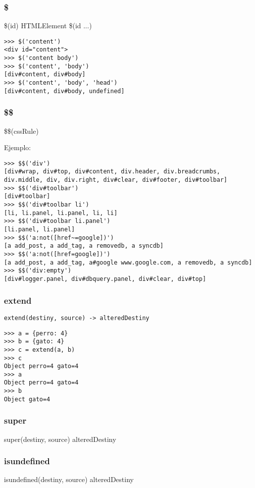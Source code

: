 \subsubsection*{\$}
\$(id) \rightarrow HTMLElement
\$(id ...) \rightarrow [HTMLElement...]

\begin{lstlisting}[style=consola]
>>> $('content')
<div id="content">
>>> $('content body')
>>> $('content', 'body')
[div#content, div#body]
>>> $('content', 'body', 'head')
[div#content, div#body, undefined]
\end{lstlisting}

\subsubsection*{\$\$}
\$\$(cssRule) \rightarrow [HTMLElement...]

\noindent
Ejemplo:
\begin{lstlisting}[style=consola]
>>> $$('div')
[div#wrap, div#top, div#content, div.header, div.breadcrumbs, div.middle, div, div.right, div#clear, div#footer, div#toolbar]
>>> $$('div#toolbar')
[div#toolbar]
>>> $$('div#toolbar li')
[li, li.panel, li.panel, li, li]
>>> $$('div#toolbar li.panel')
[li.panel, li.panel]
>>> $$('a:not([href~=google])')
[a add_post, a add_tag, a removedb, a syncdb]
>>> $$('a:not([href=google])')
[a add_post, a add_tag, a#google www.google.com, a removedb, a syncdb]
>>> $$('div:empty')
[div#logger.panel, div#dbquery.panel, div#clear, div#top]
\end{lstlisting}

\subsubsection*{extend}
\verb|extend(destiny, source) -> alteredDestiny|

\begin{lstlisting}[style=consola]
>>> a = {perro: 4}
>>> b = {gato: 4}
>>> c = extend(a, b)
>>> c
Object perro=4 gato=4
>>> a
Object perro=4 gato=4
>>> b
Object gato=4
\end{lstlisting}

\subsubsection*{super}
super(destiny, source) \rightarrow alteredDestiny
\subsubsection*{isundefined}
isundefined(destiny, source) \rightarrow alteredDestiny
